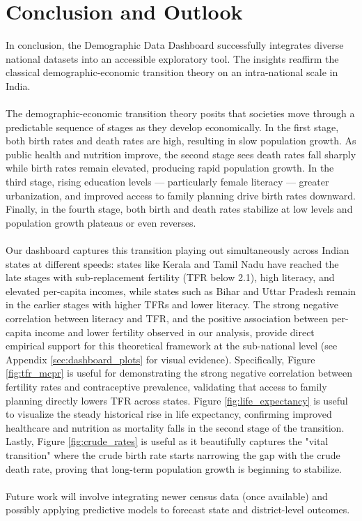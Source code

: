 \documentclass[abstract=true]{scrartcl}
\begin{document}
\section{Conclusion and Outlook}
In conclusion, the Demographic Data Dashboard successfully integrates diverse national datasets into an accessible exploratory tool. The insights reaffirm the classical demographic-economic transition theory on an intra-national scale in India.
\\\\
The demographic-economic transition theory posits that societies move through a predictable sequence of stages as they develop economically. In the first stage, both birth rates and death rates are high, resulting in slow population growth. As public health and nutrition improve, the second stage sees death rates fall sharply while birth rates remain elevated, producing rapid population growth. In the third stage, rising education levels --- particularly female literacy --- greater urbanization, and improved access to family planning drive birth rates downward. Finally, in the fourth stage, both birth and death rates stabilize at low levels and population growth plateaus or even reverses. 
\\\\
Our dashboard captures this transition playing out simultaneously across Indian states at different speeds: states like Kerala and Tamil Nadu have reached the late stages with sub-replacement fertility (TFR below 2.1), high literacy, and elevated per-capita incomes, while states such as Bihar and Uttar Pradesh remain in the earlier stages with higher TFRs and lower literacy. The strong negative correlation between literacy and TFR, and the positive association between per-capita income and lower fertility observed in our analysis, provide direct empirical support for this theoretical framework at the sub-national level (see Appendix \ref{sec:dashboard_plots} for visual evidence). Specifically, Figure \ref{fig:tfr_mcpr} is useful for demonstrating the strong negative correlation between fertility rates and contraceptive prevalence, validating that access to family planning directly lowers TFR across states. Figure \ref{fig:life_expectancy} is useful to visualize the steady historical rise in life expectancy, confirming improved healthcare and nutrition as mortality falls in the second stage of the transition. Lastly, Figure \ref{fig:crude_rates} is useful as it beautifully captures the "vital transition" where the crude birth rate starts narrowing the gap with the crude death rate, proving that long-term population growth is beginning to stabilize.
\\\\
Future work will involve integrating newer census data (once available) and possibly applying predictive models to forecast state and district-level outcomes. 
\end{document}
